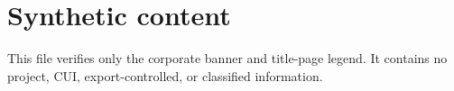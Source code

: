\documentclass{linearspace-report}
\begin{document}
\LSMakeReportTitle
\chapter{Synthetic content}
This file verifies only the corporate banner and title-page legend. It contains
no project, CUI, export-controlled, or classified information.
\end{document}
